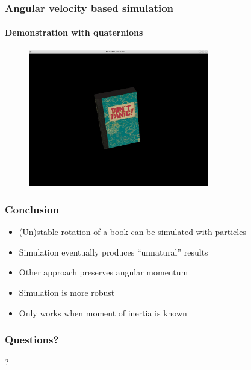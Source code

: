 \documentclass{beamer}
\begin{document}
\begin{frame}
 \frametitle{Angular velocity based simulation}
 \framesubtitle{Demonstration with quaternions}
 \begin{figure}
  \centering
  \includegraphics[width=0.7\textwidth]{demo.jpg}
 \end{figure}
\end{frame}

\begin{frame}
 \frametitle{Conclusion}
 \begin{itemize}
  \item (Un)stable rotation of a book can be simulated with particles
  \item Simulation eventually produces ``unnatural'' results
  \item Other approach preserves angular momentum
  \item Simulation is more robust
  \item Only works when moment of inertia is known
 \end{itemize}
\end{frame}


 \begin{frame}
  \frametitle{Questions?}
  \begin{center}
   \Huge{?}
  \end{center}
 \end{frame}
\end{document}
